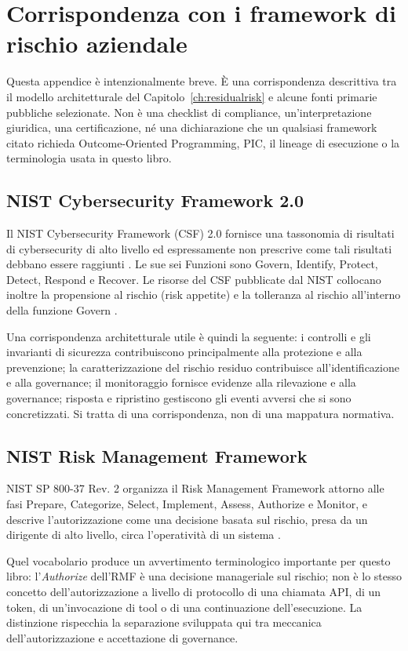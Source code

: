 \documentclass[10pt,oneside,openany]{book}
\begin{document}
\chapter{Corrispondenza con i framework di rischio aziendale}\label{app:frameworks}

Questa appendice è intenzionalmente breve. È una corrispondenza descrittiva tra il modello architetturale del Capitolo~\ref{ch:residualrisk} e alcune fonti primarie pubbliche selezionate. Non è una checklist di compliance, un'interpretazione giuridica, una certificazione, né una dichiarazione che un qualsiasi framework citato richieda Outcome-Oriented Programming, PIC, il lineage di esecuzione o la terminologia usata in questo libro.

\section{NIST Cybersecurity Framework 2.0}
Il NIST Cybersecurity Framework (CSF) 2.0 fornisce una tassonomia di risultati di cybersecurity di alto livello ed espressamente non prescrive come tali risultati debbano essere raggiunti \cite{nistcsf2024}. Le sue sei Funzioni sono Govern, Identify, Protect, Detect, Respond e Recover. Le risorse del CSF pubblicate dal NIST collocano inoltre la propensione al rischio (risk appetite) e la tolleranza al rischio all'interno della funzione Govern \cite{nistcsf2024}.

Una corrispondenza architetturale utile è quindi la seguente: i controlli e gli invarianti di sicurezza contribuiscono principalmente alla protezione e alla prevenzione; la caratterizzazione del rischio residuo contribuisce all'identificazione e alla governance; il monitoraggio fornisce evidenze alla rilevazione e alla governance; risposta e ripristino gestiscono gli eventi avversi che si sono concretizzati. Si tratta di una corrispondenza, non di una mappatura normativa.

\section{NIST Risk Management Framework}
NIST SP 800-37 Rev. 2 organizza il Risk Management Framework attorno alle fasi Prepare, Categorize, Select, Implement, Assess, Authorize e Monitor, e descrive l'autorizzazione come una decisione basata sul rischio, presa da un dirigente di alto livello, circa l'operatività di un sistema \cite{nistrmf2018}.

Quel vocabolario produce un avvertimento terminologico importante per questo libro: l'\emph{Authorize} dell'RMF è una decisione manageriale sul rischio; non è lo stesso concetto dell'autorizzazione a livello di protocollo di una chiamata API, di un token, di un'invocazione di tool o di una continuazione dell'esecuzione. La distinzione rispecchia la separazione sviluppata qui tra meccanica dell'autorizzazione e accettazione di governance.
\end{document}
